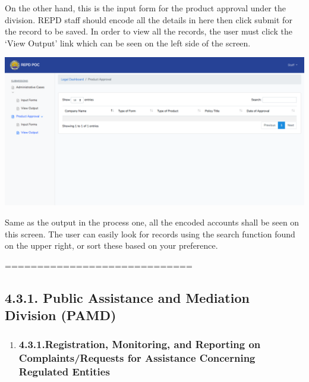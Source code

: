 \documentclass{article}
\begin{document}
On the other hand, this is the input form for the
product approval under the division. REPD staff should encode all the
details in here then click submit for the record to be saved. In order
to view all the records, the user must click the ‘View Output’ link
which can be seen on the left side of the screen.%

\includegraphics[keepaspectratio=true]{up-ic-screens/image28}{}%

Same as the output in the process one, all the encoded
accounts shall be seen on this screen. The user can easily look for
records using the search function found on the upper right, or sort
these based on your preference.%

\mdhr{}%

\noindent{}=============================%

\subsection{4.3.\hspace*{0.5em}1.  Public Assistance and Mediation Division (PAMD)}\label{sec-1-public-assistance-and-mediation-division-pamd}%

\begin{enumerate}[noitemsep,topsep=\mdcompacttopsep]%

\item{}
\subsubsection{4.3.1.\hspace*{0.5em}Registration, Monitoring, and Reporting on Complaints/Requests for Assistance Concerning Regulated Entities}\label{sec-registration-monitoring-and-reporting-on-complaintsrequests-for-assistance-concerning-regulated-entities}%
\end{enumerate}%
\end{document}
